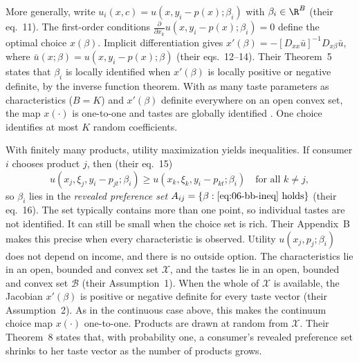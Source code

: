 More generally, write $u_i(x, c) = u(x, y_i - p(x); \beta_i)$ with $\beta_i \in \R^B$ (their eq.~11). The first-order
conditions $\frac{\partial}{\partial x_k} u(x, y_i - p(x); \beta_i) = 0$ define the optimal choice $x(\beta)$. Implicit
differentiation gives $x'(\beta) = -[D_{xx}\bar u]^{-1} D_{x\beta}\bar u$, where $\bar u(x; \beta) = u(x, y_i - p(x); \beta)$
(their eqs.~12--14). Their Theorem~5 states that $\beta_i$ is locally identified when $x'(\beta)$ is locally positive or
negative definite, by the inverse function theorem. With as many taste parameters as characteristics ($B = K$) and $x'(\beta)$
definite everywhere on an open convex set, the map $x(\cdot)$ is one-to-one and tastes are globally identified
\citep{GaleNikaido1965}. One choice identifies at most $K$ random coefficients.

With finitely many products, utility maximization yields inequalities. If consumer $i$ chooses product $j$, then (their
eq.~15)
\begin{equation}\label{eq:06-bb-ineq}
  u(x_j, \xi_j, y_i - p_{jt}; \beta_i) \ge u(x_k, \xi_k, y_i - p_{kt}; \beta_i) \quad\text{for all } k \ne j ,
\end{equation}
so $\beta_i$ lies in the \emph{revealed preference set} $A_{ij} = \{\beta : \text{\eqref{eq:06-bb-ineq} holds}\}$ (their
eq.~16). The set typically contains more than one point, so individual tastes are not identified. It can still be small when
the choice set is rich. Their Appendix~B makes this precise when every characteristic is observed. Utility
$u(x_j, p_j; \beta_i)$ does not depend on income, and there is no outside option. The characteristics lie in an open,
bounded and convex set $\mathcal{X}$, and the tastes lie in an open, bounded and convex set $\mathcal{B}$ (their
Assumption~1). When the whole of $\mathcal{X}$ is available, the Jacobian $x'(\beta)$ is positive or negative definite
for every taste vector (their Assumption~2). As in the continuous case above, this makes the continuum choice map
$x(\cdot)$ one-to-one. Products are drawn at random from $\mathcal{X}$. Their Theorem~8 states that, with probability
one, a consumer's revealed preference set shrinks to her taste vector as the number of products grows.


